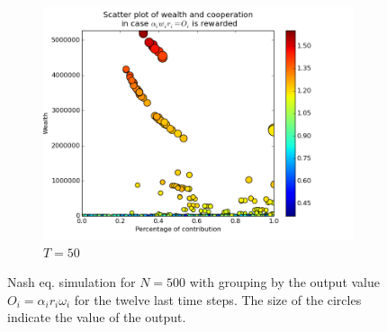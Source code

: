 \documentclass{article}
\begin{document}
\begin{figure}[h]
\begin{subfigure}[t]{0.333\textwidth}
\includegraphics[width=\textwidth]{nq_output_scatter/scatter_ranking_1_050.png}
\caption{$T = 50$}
\end{subfigure}%


\bigskip

\caption{Nash eq. simulation for $N=500$ with grouping by the output value $O_i = \alpha_i r_i \omega_i$ for the twelve last time steps. The size of the circles indicate the value of the output.}
\end{figure}
\end{document}
